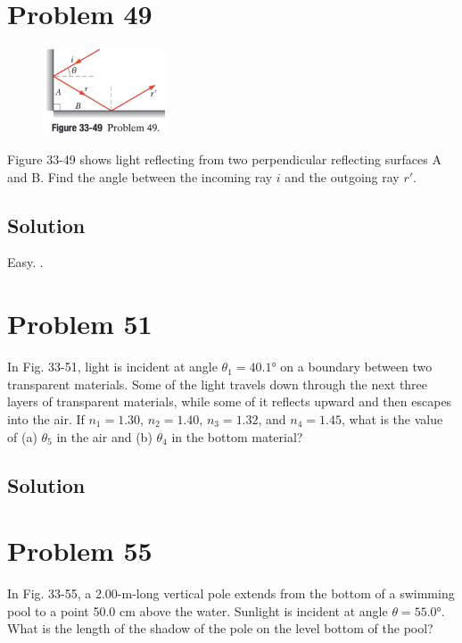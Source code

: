 \documentclass[12pt]{article}
\begin{document}
    \pagebreak
    \section{Problem 49}
        \begin{figure}
            \vspace{-30pt}
            \includegraphics[width=0.33\textwidth]{33-49.png} 
        \end{figure}
        Figure 33-49 shows light reflecting from two perpendicular reflecting surfaces A and B. 
        Find the angle between the incoming ray $i$ and the outgoing ray $r'$.

        \subsection{Solution}
            Easy. \boxed{180\unit{\degree}}.

    \pagebreak
    \section{Problem 51}
        In Fig. 33-51, light is incident at angle $\theta_1 = 40.1\unit{\degree}$ on a boundary between two transparent materials. 
        Some of the light travels down through the next three layers of transparent materials, while some of it reflects upward and then escapes into the air. 
        If $n_1 = 1.30$, $n_2 = 1.40$, $n_3 = 1.32$, and $n_4 = 1.45$, what is the value of (a) $\theta_5$ in the air and (b) $\theta_4$ in the bottom material?

        \subsection{Solution}

    \pagebreak
    \section{Problem 55}
        In Fig. 33-55, a 2.00-m-long vertical pole extends from the bottom of a swimming pool to a point 50.0 cm above the water.
        Sunlight is incident at angle $\theta = 55.0\unit{\degree}$. What is the length of the shadow of the pole on the level bottom of the pool?
\end{document}
